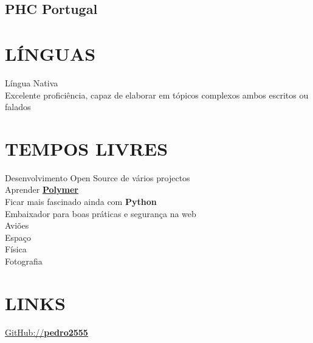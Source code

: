 \documentclass[letterpaper]{deedy-resume} %
\begin{document}
\begin{minipage}[t]{0.33\textwidth}
\subsection{PHC Portugal}

\sectionspace

\section{LÍNGUAS}
Língua Nativa\\
Excelente proficiência, capaz de elaborar em tópicos complexos ambos escritos ou falados\\

\section{TEMPOS LIVRES}
Desenvolvimento Open Source de vários projectos\\
Aprender \textbf{\href{https://www.polymer-project.org/}{Polymer}}\\
Ficar mais fascinado ainda com \textbf{Python}\\
Embaixador para boas práticas e segurança na web\\
Aviões\\
Espaço\\
Física\\
Fotografia\\

\section{LINKS}
\href{https://github.com/pedro2555}{GitHub://\textbf{pedro2555}}\\

\end{minipage}
\hfill
%
%
\end{document}
